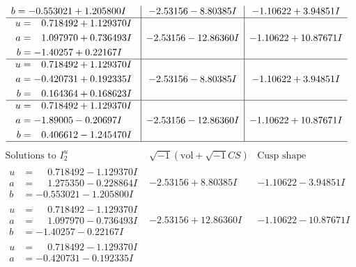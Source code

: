 \documentclass[1p]{elsarticle_modified}
\theoremstyle{definition}
\newcommand{\I}{\sqrt{-1}}
\begin{document}
$$\begin{array}{c|c|c}
\begin{aligned}
b &= -0.553021 + 1.205800 I\end{aligned}
 & -2.53156 - 8.80385 I & -1.10622 + 3.94851 I \\ \hline\begin{aligned}
u &= \phantom{-}0.718492 + 1.129370 I \\
a &= \phantom{-}1.097970 + 0.736493 I \\
b &= -1.40257 + 0.22167 I\end{aligned}
 & -2.53156 - 12.86360 I & -1.10622 + 10.87671 I \\ \hline\begin{aligned}
u &= \phantom{-}0.718492 + 1.129370 I \\
a &= -0.420731 + 0.192335 I \\
b &= \phantom{-}0.164364 + 0.168623 I\end{aligned}
 & -2.53156 - 8.80385 I & -1.10622 + 3.94851 I \\ \hline\begin{aligned}
u &= \phantom{-}0.718492 + 1.129370 I \\
a &= -1.89005 - 0.20697 I \\
b &= \phantom{-}0.406612 - 1.245470 I\end{aligned}
 & -2.53156 - 12.86360 I & -1.10622 + 10.87671 I\\
 \hline 
 \end{array}$$\newpage$$\begin{array}{c|c|c}  
\text{Solutions to }I^u_{2}& \I (\text{vol} + \sqrt{-1}CS) & \text{Cusp shape}\\
 \hline 
\begin{aligned}
u &= \phantom{-}0.718492 - 1.129370 I \\
a &= \phantom{-}1.275350 - 0.228864 I \\
b &= -0.553021 - 1.205800 I\end{aligned}
 & -2.53156 + 8.80385 I & -1.10622 - 3.94851 I \\ \hline\begin{aligned}
u &= \phantom{-}0.718492 - 1.129370 I \\
a &= \phantom{-}1.097970 - 0.736493 I \\
b &= -1.40257 - 0.22167 I\end{aligned}
 & -2.53156 + 12.86360 I & -1.10622 - 10.87671 I \\ \hline\begin{aligned}
u &= \phantom{-}0.718492 - 1.129370 I \\
a &= -0.420731 - 0.192335 I \\

\end{aligned}
\end{array}$$
\end{document}

